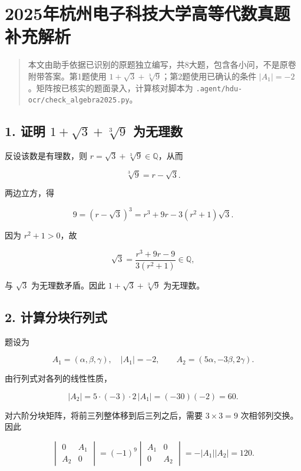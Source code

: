 \documentclass[11pt,fontset=fandol]{ctexart}
\begin{document}
\section{2025年杭州电子科技大学高等代数真题补充解析}\label{ux5e74ux676dux5ddeux7535ux5b50ux79d1ux6280ux5927ux5b66ux9ad8ux7b49ux4ee3ux6570ux771fux9898ux8865ux5145ux89e3ux6790}

\begin{quote}
本文由助手依据已识别的原题独立编写，共8大题，包含各小问，不是原卷附带答案。第1题使用
\(1+\sqrt3+\sqrt[3]9\)；第2题使用已确认的条件
\(|A_1|=-2\)。矩阵按已核实的题面录入，计算核对脚本为
\texttt{.agent/hdu-ocr/check\_algebra2025.py}。
\end{quote}

\subsection{\texorpdfstring{1. 证明 \(1+\sqrt3+\sqrt[3]9\)
为无理数}{1. 证明 1+\textbackslash sqrt3+\textbackslash sqrt{[}3{]}9 为无理数}}\label{ux8bc1ux660e-1sqrt3sqrt39-ux4e3aux65e0ux7406ux6570}

反设该数是有理数，则 \(r=\sqrt3+\sqrt[3]9\in\mathbb Q\)，从而

\[
\sqrt[3]9=r-\sqrt3.
\]

两边立方，得

\[
9=(r-\sqrt3)^3
=r^3+9r-3(r^2+1)\sqrt3.
\]

因为 \(r^2+1>0\)，故

\[
\sqrt3=\frac{r^3+9r-9}{3(r^2+1)}\in\mathbb Q,
\]

与 \(\sqrt3\) 为无理数矛盾。因此
\(\boxed{1+\sqrt3+\sqrt[3]9\text{ 为无理数}}\)。

\subsection{2.
计算分块行列式}\label{ux8ba1ux7b97ux5206ux5757ux884cux5217ux5f0f}

题设为

\[
A_1=(\alpha,\beta,\gamma),\quad |A_1|=-2,\qquad
A_2=(5\alpha,-3\beta,2\gamma).
\]

由行列式对各列的线性性质，

\[
|A_2|=5\cdot(-3)\cdot2\,|A_1|=(-30)(-2)=60.
\]

对六阶分块矩阵，将前三列整体移到后三列之后，需要 \(3\times3=9\)
次相邻列交换。因此

\[
\begin{vmatrix}0&A_1\\A_2&0\end{vmatrix}
=(-1)^9\begin{vmatrix}A_1&0\\0&A_2\end{vmatrix}
=-|A_1||A_2|
=\boxed{120}.
\]
\end{document}
